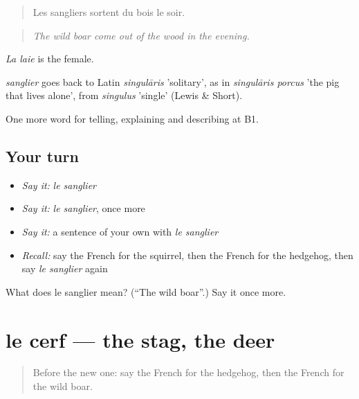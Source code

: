 \begin{quote}
Les sangliers sortent du bois le soir.
\end{quote}

\begin{quote}
\emph{The wild boar come out of the wood in the evening.}
\end{quote}

\emph{La laie} is the female.

\begin{cousinweb}
\emph{sanglier} goes back to Latin \emph{singulāris} 'solitary', as in \emph{singulāris porcus} 'the pig that lives alone', from \emph{singulus} 'single' (Lewis \& Short).
\end{cousinweb}

\begin{grammarlens}[title={What you've built}]
One more word for telling, explaining and describing at B1.
\end{grammarlens}

\subsection*{Your turn}
\begin{itemize}
\raggedright
  \item \emph{Say it:} \emph{le sanglier}
  \item \emph{Say it:} \emph{le sanglier}, once more
  \item \emph{Say it:} a sentence of your own with \emph{le sanglier}
  \item \emph{Recall:} say the French for the squirrel, then the French for the hedgehog, then say \emph{le sanglier} again
\end{itemize}

\begin{tcolorbox}[breakable,colback=teal!4,colframe=teal!35!black,title={Before you move on}]
What does le sanglier mean? (\textquotedblleft{}The wild boar\textquotedblright{}.) Say it once more.
\end{tcolorbox}
\section[le cerf]{le cerf — the stag, the deer}

\label{lesson:FR-C459-cerf}



\begin{quote}
Before the new one: say the French for the hedgehog, then the French for the wild boar.
\end{quote}

